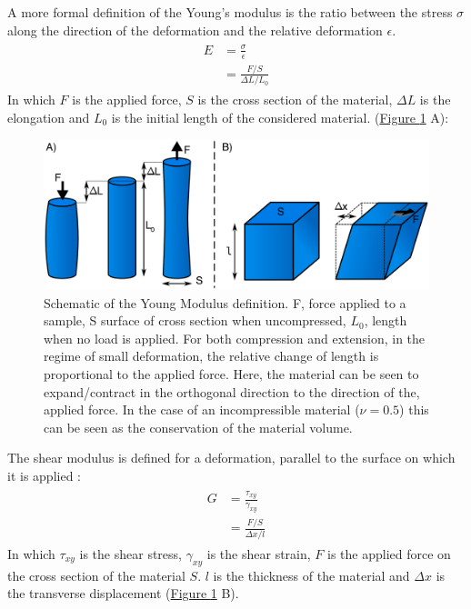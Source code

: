 \documentclass[A4paperpaper,11pt,english]{sphinxmanual}
\begin{document}
A  more formal definition of the Young's modulus is the ratio between
the stress \(\sigma\) along the direction of the deformation and the relative deformation \(\epsilon\).
\label{index-latex:equation-eqa8}\begin{gather}
\begin{split}E &= \frac{\sigma}{\epsilon} \\
  & = \frac{   F/S }{   \Delta L / L_0        }\end{split}\label{index-latex-eqa8}
\end{gather}
In which \(F\) is the applied force, \(S\) is the cross section of the
material, \(\Delta L\) is the elongation and \(L_0\) is the initial
length of the considered material.  (\hyperref[index-latex:fym]{Figure  \ref*{index-latex:fym}} A):
\begin{figure}[htbp]
\centering
\capstart

\includegraphics[width=0.800\linewidth]{youngm.png}
\caption{Schematic of the Young Modulus definition. F, force applied to a sample, S
surface of cross section when uncompressed, \(L_0\), length when no load
is applied. For both compression and extension, in the regime of small
deformation, the relative change of length is proportional to the applied
force. Here, the material can be seen to expand/contract in the orthogonal direction
to the direction of the, applied force. In the case of an
incompressible material (\(\nu = 0.5\)) this can be seen as the
conservation of the material volume.}\label{index-latex:fym}\end{figure}

The shear modulus is defined for a deformation, parallel to the surface on which it is applied :
\label{index-latex:equation-eqa9}\begin{gather}
\begin{split}G &= \frac{\tau_{xy}}{\gamma_{xy}} \\
  & = \frac{   F/S }{   \Delta x / l        }\end{split}\label{index-latex-eqa9}
\end{gather}
In which \(\tau_{xy}\) is the shear stress, \(\gamma_{xy}\) is the shear strain, \(F\) is the applied force
on the cross section of the material \(S\). \(l\) is the thickness of the material and \(\Delta x\) is the
transverse displacement (\hyperref[index-latex:fym]{Figure  \ref*{index-latex:fym}} B).
\end{document}
